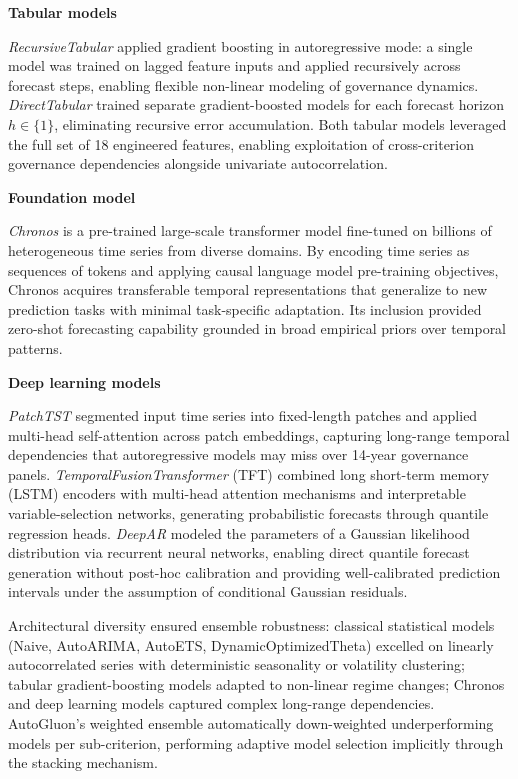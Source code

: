 \documentclass[12pt,a4paper]{article}
\begin{document}
\textbf{Tabular models}

\emph{RecursiveTabular} applied gradient boosting in autoregressive mode: a single model was trained on lagged feature inputs and applied recursively across forecast steps, enabling flexible non-linear modeling of governance dynamics. \emph{DirectTabular} trained separate gradient-boosted models for each forecast horizon $h \in \{1\}$, eliminating recursive error accumulation. Both tabular models leveraged the full set of 18 engineered features, enabling exploitation of cross-criterion governance dependencies alongside univariate autocorrelation.

\textbf{Foundation model}

\emph{Chronos} \citep{Ansari2024} is a pre-trained large-scale transformer model fine-tuned on billions of heterogeneous time series from diverse domains. By encoding time series as sequences of tokens and applying causal language model pre-training objectives, Chronos acquires transferable temporal representations that generalize to new prediction tasks with minimal task-specific adaptation. Its inclusion provided zero-shot forecasting capability grounded in broad empirical priors over temporal patterns.

\textbf{Deep learning models}

\emph{PatchTST} \citep{Nie2023} segmented input time series into fixed-length patches and applied multi-head self-attention across patch embeddings, capturing long-range temporal dependencies that autoregressive models may miss over 14-year governance panels. \emph{TemporalFusionTransformer} (TFT) \citep{Lim2021} combined long short-term memory (LSTM) encoders with multi-head attention mechanisms and interpretable variable-selection networks, generating probabilistic forecasts through quantile regression heads. \emph{DeepAR} \citep{Salinas2020} modeled the parameters of a Gaussian likelihood distribution via recurrent neural networks, enabling direct quantile forecast generation without post-hoc calibration and providing well-calibrated prediction intervals under the assumption of conditional Gaussian residuals.

Architectural diversity ensured ensemble robustness: classical statistical models (Naive, AutoARIMA, AutoETS, DynamicOptimizedTheta) excelled on linearly autocorrelated series with deterministic seasonality or volatility clustering; tabular gradient-boosting models adapted to non-linear regime changes; Chronos and deep learning models captured complex long-range dependencies. AutoGluon's weighted ensemble automatically down-weighted underperforming models per sub-criterion, performing adaptive model selection implicitly through the stacking mechanism.
\end{document}
